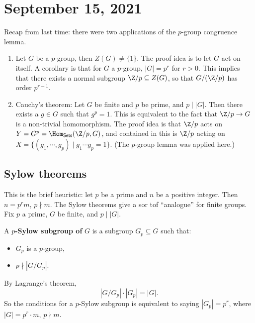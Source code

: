 \section{September 15, 2021} 
Recap from last time: there were two applications of the $p$-group congruence lemma.
\begin{enumerate}[label=(\arabic*)]
\setlength\itemsep{-.2em}
    \item Let $G$ be a $p$-group, then $Z(G) \neq \{1\} $. The proof idea is to let $G$ act on itself. A corollary is that for $G$ a $p$-group, $|G|=p^r$ for $r>0$. This implies that there exists a normal subgroup $\Z / p \subseteq Z(G)$, so that $G / (\Z /p)$ has order $p ^{r-1}$.
    \item Cauchy's theorem: Let $G$ be finite and $p$ be prime, and $p \mid  |G|$. Then there exists a $g \in G$ such that $g ^p=1$. This is equivalent to the fact that $\Z /p \to G$ is a non-trivial homomorphism. The proof idea is that $\Z / p$ acts on $Y= G^p=\Hom _{\mathsf{Sets} }(\Z /p, G)$, and contained in this is $\Z /p$ acting on $X= \{(g_1,\cdots ,g_p) \mid  g_1 \cdots g_p=1\} $. (The $p$-group lemma was applied here.)
\end{enumerate}

 \subsection{Sylow theorems}
 This is the brief heuristic: let $p$ be a prime and $n$ be a positive integer. Then $n=p^r m$, $p \nmid m$. The Sylow theorems give a sor tof ``analogue'' for finite groups. Fix $p$ a prime, $G$ be finite, and $p \mid |G|$.

 \begin{definition}[]
     A $p$\textbf{-Sylow subgroup of} $G$ is a subgroup $G_p \subseteq G$ such that:
     \begin{itemize}
     \setlength\itemsep{-.2em}
         \item $G_p$ is a $p$-group,
            \item $p \nmid |G / G_p|$.
     \end{itemize}
 \end{definition}
 \begin{note}
    By Lagrange's theorem, \[
    |G /G_p| \cdot |G_p|=|G|.
\]  So the conditions for a $p$-Sylow subgroup is equivalent to saying $|G_p|=p^r$, where $|G|=p^r \cdot m$, $p \nmid m$.
 \end{note}

